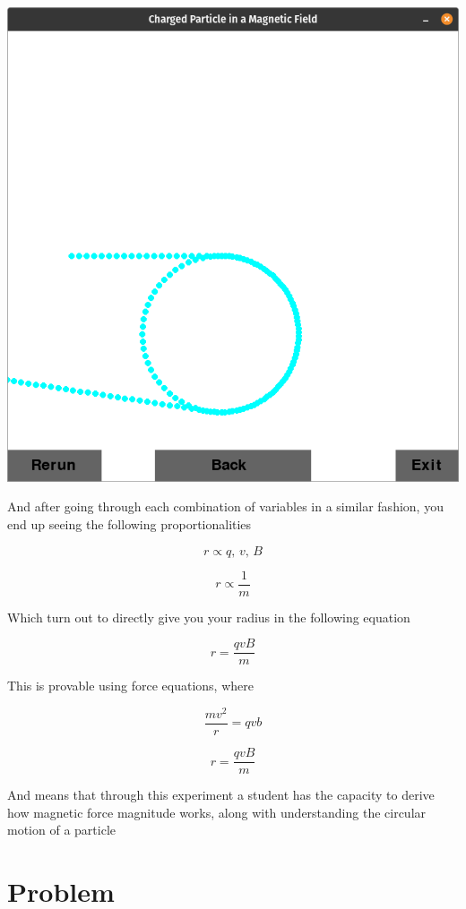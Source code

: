 \documentclass[11pt]{article}
\begin{document}
   			\includegraphics[scale=0.3]{6}
   			
   			And after going through each combination of variables in a similar fashion, you end up seeing the following proportionalities
   			
   			\[r \propto q,\,v,\,B\]
   			
   			\[r \propto \frac{1}{m}\]
   			
   			Which turn out to directly give you your radius in the following equation
   			
   			\[r = \frac{qvB}{m}\]
   			
   			This is provable using force equations, where
   			
   			\[\frac{m v^2}{r} = q v b\]
   			
   			\[r = \frac{qvB}{m}\]
   			
   			And means that through this experiment a student has the capacity to derive how magnetic force magnitude works, along with understanding the circular motion of a particle
   			
   	    \section*{Problem}
   	    
\end{document}
